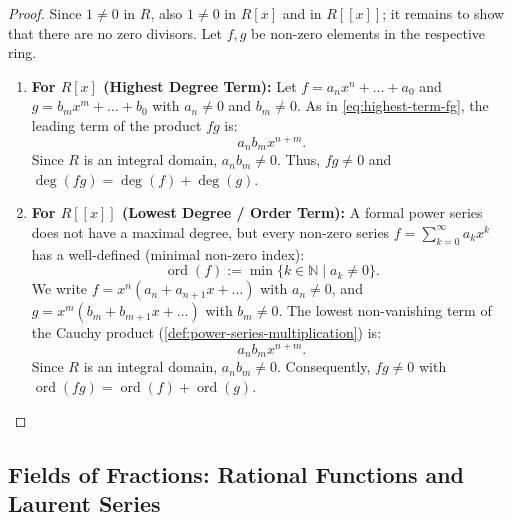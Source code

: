 \begin{content}

\begin{proof}
Since $1 \neq 0$ in $R$, also $1 \neq 0$ in $R[x]$ and in $R[[x]]$; it remains to show that there are no zero divisors. Let $f, g$ be non-zero elements in the respective ring.
\begin{enumerate}[label=\textbf{(\arabic*)}]
    \item \textbf{For $R[x]$ (Highest Degree Term):}
    Let $f = a_n x^n + \dots + a_0$ and $g = b_m x^m + \dots + b_0$ with $a_n \neq 0$ and $b_m \neq 0$. As in \eqref{eq:highest-term-fg}, the leading term of the product $f g$ is:
    \[
    a_n b_m x^{n+m}.
    \]
    Since $R$ is an integral domain, $a_n b_m \neq 0$. Thus, $f g \neq 0$ and $\deg(f g) = \deg(f) + \deg(g)$.
    \item \textbf{For $R[[x]]$ (Lowest Degree / Order Term):}
    A formal power series does not have a maximal degree, but every non-zero series $f = \sum_{k=0}^\infty a_k x^k$ has a well-defined  (minimal non-zero index):
    \[
    \operatorname{ord}(f) := \min \{ k \in \mathbb{N} \mid a_k \neq 0 \}.
    \]
    We write $f = x^n (a_n + a_{n+1} x + \dots)$ with $a_n \neq 0$, and $g = x^m (b_m + b_{m+1} x + \dots)$ with $b_m \neq 0$. The lowest non-vanishing term of the Cauchy product (\cref{def:power-series-multiplication}) is:
    \[
    a_n b_m x^{n+m}.
    \]
    Since $R$ is an integral domain, $a_n b_m \neq 0$. Consequently, $f g \neq 0$ with $\operatorname{ord}(f g) = \operatorname{ord}(f) + \operatorname{ord}(g)$.
\end{enumerate}
\end{proof}
\end{content}

\subsection{Fields of Fractions: Rational Functions and Laurent Series}

